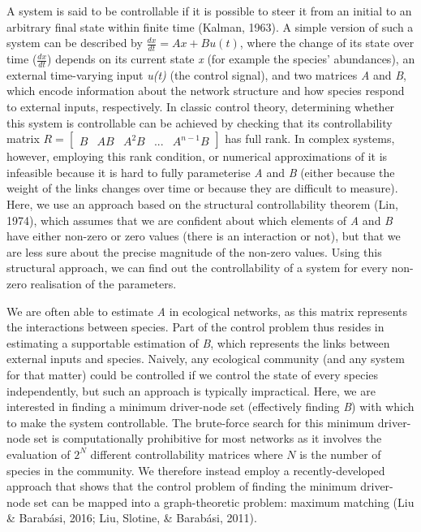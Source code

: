 \documentclass[a4paper]{artikel1}
\theoremstyle{definition}
\theoremstyle{definition}
\theoremstyle{definition}
\theoremstyle{remark}
\begin{document}
A system is said to be controllable if it is possible to steer it from
an initial to an arbitrary final state within finite time (Kalman,
1963). A simple version of such a system can be described by
\(\frac{dx}{dt} = Ax + Bu(t)\), where the change of its state over time
(\(\frac{dx}{dt}\)) depends on its current state \emph{x} (for example
the species' abundances), an external time-varying input \emph{u(t)}
(the control signal), and two matrices \emph{A} and \emph{B}, which
encode information about the network structure and how species respond
to external inputs, respectively. In classic control theory, determining
whether this system is controllable can be achieved by checking that its
controllability matrix
\(R= [ \begin{matrix}B & AB & A^{2}B & ...& A^{n-1}B\end{matrix} ]\) has
full rank. In complex systems, however, employing this rank condition,
or numerical approximations of it is infeasible because it is hard to
fully parameterise \emph{A} and \emph{B} (either because the weight of
the links changes over time or because they are difficult to measure).
Here, we use an approach based on the structural controllability theorem
(Lin, 1974), which assumes that we are confident about which elements of
\emph{A} and \emph{B} have either non-zero or zero values (there is an
interaction or not), but that we are less sure about the precise
magnitude of the non-zero values. Using this structural approach, we can
find out the controllability of a system for every non-zero realisation
of the parameters.

We are often able to estimate \emph{A} in ecological networks, as this
matrix represents the interactions between species. Part of the control
problem thus resides in estimating a supportable estimation of \emph{B},
which represents the links between external inputs and species. Naively,
any ecological community (and any system for that matter) could be
controlled if we control the state of every species independently, but
such an approach is typically impractical. Here, we are interested in
finding a minimum driver-node set (effectively finding \emph{B}) with
which to make the system controllable. The brute-force search for this
minimum driver-node set is computationally prohibitive for most networks
as it involves the evaluation of \(2^N\) different controllability
matrices where \(N\) is the number of species in the community. We
therefore instead employ a recently-developed approach that shows that
the control problem of finding the minimum driver-node set can be mapped
into a graph-theoretic problem: maximum matching (Liu \& Barabási, 2016;
Liu, Slotine, \& Barabási, 2011).
\end{document}
